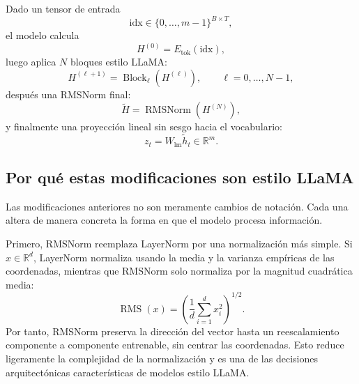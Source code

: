\documentclass[11pt]{report}
\theoremstyle{definition}
\theoremstyle{plain}
\numberwithin{equation}{section}
\begin{document}
Dado un tensor de entrada
\begin{equation*}
    \mathrm{idx}\in\{0,\ldots,m-1\}^{B\times T},
\end{equation*}
el modelo calcula
\begin{equation*}
    H^{(0)}
    =
    E_{\mathrm{tok}}(\mathrm{idx}),
\end{equation*}
luego aplica \(N\) bloques estilo LLaMA:
\begin{equation*}
    H^{(\ell+1)}
    =
    \operatorname{Block}_{\ell}(H^{(\ell)}),
    \qquad
    \ell=0,\ldots,N-1,
\end{equation*}
después una RMSNorm final:
\begin{equation*}
    \widetilde{H}
    =
    \operatorname{RMSNorm}(H^{(N)}),
\end{equation*}
y finalmente una proyección lineal sin sesgo hacia el vocabulario:
\begin{equation*}
    z_t
    =
    W_{\mathrm{lm}}\widetilde{h}_t
    \in\mathbb{R}^m.
\end{equation*}

\subsection{Por qué estas modificaciones son estilo LLaMA}

Las modificaciones anteriores no son meramente cambios de notación. Cada una altera de manera concreta la forma en que el modelo procesa información.

Primero, RMSNorm reemplaza LayerNorm por una normalización más simple. Si \(x\in\mathbb{R}^d\), LayerNorm normaliza usando la media y la varianza empíricas de las coordenadas, mientras que RMSNorm solo normaliza por la magnitud cuadrática media:
\begin{equation*}
    \operatorname{RMS}(x)
    =
    \left(
        \frac{1}{d}
        \sum_{i=1}^{d}x_i^2
    \right)^{1/2}.
\end{equation*}
Por tanto, RMSNorm preserva la dirección del vector hasta un reescalamiento componente a componente entrenable, sin centrar las coordenadas. Esto reduce ligeramente la complejidad de la normalización y es una de las decisiones arquitectónicas características de modelos estilo LLaMA.
\end{document}
